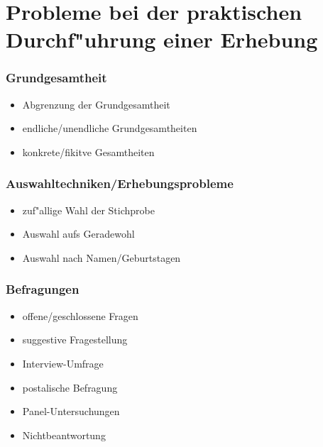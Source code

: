 \documentclass{beamer}
\begin{document}
\section{Probleme bei der praktischen Durchf"uhrung einer Erhebung}
\begin{frame}
  \frametitle{Grundgesamtheit}
  \begin{itemize}[<+->]
    \item Abgrenzung der Grundgesamtheit
    \item endliche/unendliche Grundgesamtheiten
    \item konkrete/fikitve Gesamtheiten
  \end{itemize}
\end{frame}
\begin{frame}
  \frametitle{Auswahltechniken/Erhebungsprobleme}
  \begin{itemize}[<+->]
    \item zuf"allige Wahl der Stichprobe
    \item Auswahl aufs Geradewohl
    \item Auswahl nach Namen/Geburtstagen
  \end{itemize}
\end{frame}
\begin{frame}
  \frametitle{Befragungen}
  \begin{itemize}[<+->]
    \item offene/geschlossene Fragen
    \item suggestive Fragestellung
    \item Interview-Umfrage
    \item postalische Befragung
    \item Panel-Untersuchungen
    \item Nichtbeantwortung
  \end{itemize}
\end{frame}
\end{document}
